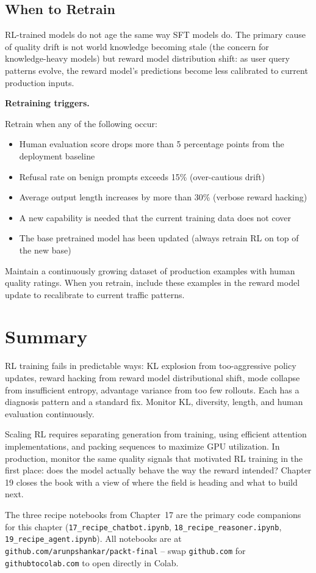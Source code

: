\begin{chapterenv}
\subsection{When to Retrain}

RL-trained models do not age the same way SFT models do. The primary cause of quality drift is not world knowledge becoming stale (the concern for knowledge-heavy models) but reward model distribution shift: as user query patterns evolve, the reward model's predictions become less calibrated to current production inputs.

\begin{tipbox}
\textbf{Retraining triggers.}

Retrain when any of the following occur:
\begin{itemize}
\item Human evaluation score drops more than 5 percentage points from the deployment baseline
\item Refusal rate on benign prompts exceeds 15\% (over-cautious drift)
\item Average output length increases by more than 30\% (verbose reward hacking)
\item A new capability is needed that the current training data does not cover
\item The base pretrained model has been updated (always retrain RL on top of the new base)
\end{itemize}

Maintain a continuously growing dataset of production examples with human quality ratings. When you retrain, include these examples in the reward model update to recalibrate to current traffic patterns.
\end{tipbox}

\section{Summary}

RL training fails in predictable ways: KL explosion from too-aggressive policy updates, reward hacking from reward model distributional shift, mode collapse from insufficient entropy, advantage variance from too few rollouts. Each has a diagnosis pattern and a standard fix. Monitor KL, diversity, length, and human evaluation continuously.

Scaling RL requires separating generation from training, using efficient attention implementations, and packing sequences to maximize GPU utilization. In production, monitor the same quality signals that motivated RL training in the first place: does the model actually behave the way the reward intended? Chapter 19 closes the book with a view of where the field is heading and what to build next.


The three recipe notebooks from Chapter~17 are the primary code companions for this chapter (\texttt{17\_recipe\_chatbot.ipynb}, \texttt{18\_recipe\_reasoner.ipynb}, \texttt{19\_recipe\_agent.ipynb}). All notebooks are at \texttt{github.com/arunpshankar/packt-final} -- swap \texttt{github.com} for \texttt{githubtocolab.com} to open directly in Colab.

\end{chapterenv}
